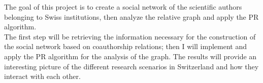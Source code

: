 \documentclass[12 pt]{article}
\begin{document}
The goal of this project is to create a social network of the scientific authors belonging to Swiss institutions, then analyze the relative graph and apply the PR algorithm.\\
The first step will be retrieving the information necessary for the construction of the social network based on coauthorship relations; then I will implement and apply the PR algorithm for the analysis of the graph.
The results will provide an interesting picture of the different research scenarios in Switzerland and how they interact with each other.
\end{document}
